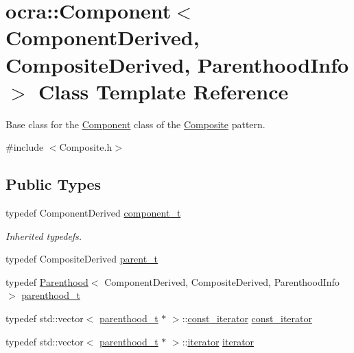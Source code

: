 \hypertarget{classocra_1_1Component}{}\section{ocra\+:\+:Component$<$ Component\+Derived, Composite\+Derived, Parenthood\+Info $>$ Class Template Reference}
\label{classocra_1_1Component}


Base class for the \hyperlink{classocra_1_1Component}{Component} class of the \hyperlink{classocra_1_1Composite}{Composite} pattern.  




{\ttfamily \#include $<$Composite.\+h$>$}

\subsection*{Public Types}
{\bf }\par
\begin{DoxyCompactItemize}
\item 
typedef Component\+Derived \hyperlink{classocra_1_1Component_aecb250aaac3aad8d82ba30303b10cf2a}{component\+\_\+t}
\begin{DoxyCompactList}\small\item\em Inherited typedefs. \end{DoxyCompactList}\item 
typedef Composite\+Derived \hyperlink{classocra_1_1Component_a2111c5ff33bd22310754dfd54c9e2a34}{parent\+\_\+t}
\item 
typedef \hyperlink{classocra_1_1Parenthood}{Parenthood}$<$ Component\+Derived, Composite\+Derived, Parenthood\+Info $>$ \hyperlink{classocra_1_1Component_a70fb7cda78934a9f017c7e46c1407953}{parenthood\+\_\+t}
\item 
typedef std\+::vector$<$ \hyperlink{classocra_1_1Component_a70fb7cda78934a9f017c7e46c1407953}{parenthood\+\_\+t} $\ast$ $>$\+::\hyperlink{classocra_1_1Component_a6271631f04d2911e4369d1288074eebb}{const\+\_\+iterator} \hyperlink{classocra_1_1Component_a6271631f04d2911e4369d1288074eebb}{const\+\_\+iterator}
\item 
typedef std\+::vector$<$ \hyperlink{classocra_1_1Component_a70fb7cda78934a9f017c7e46c1407953}{parenthood\+\_\+t} $\ast$ $>$\+::\hyperlink{classocra_1_1Component_a9b76b63c3248ec96dfdaca00d712c1c9}{iterator} \hyperlink{classocra_1_1Component_a9b76b63c3248ec96dfdaca00d712c1c9}{iterator}
\end{DoxyCompactItemize}

